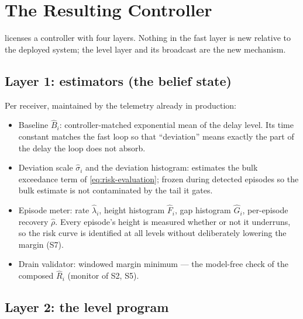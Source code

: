 \documentclass[11pt, a4paper]{article}
\theoremstyle{definition}
\theoremstyle{plain}
\theoremstyle{remark}
\begin{document}
\section{The Resulting Controller}\label{sec:controller}

 licenses a controller with four layers.  Nothing in
the fast layer is new relative to the deployed system; the level layer
and its broadcast are the new mechanism.

\subsection{Layer 1: estimators (the belief state)}
\label{sec:layer-estimators}

Per receiver, maintained by the telemetry already in production:
\begin{itemize}
  \item Baseline $\hat B_i$: controller-matched exponential mean of the
    delay level.  Its time constant matches the fast loop so that
    ``deviation'' means exactly the part of the delay the loop does not
    absorb.
  \item Deviation scale $\hat\sigma_i$ and the deviation histogram:
    estimates the bulk exceedance term of \cref{eq:risk-evaluation};
    frozen during detected episodes so the bulk estimate is not
    contaminated by the tail it gates.
  \item Episode meter: rate $\hat\lambda_i$, height histogram
    $\hat F_i$, gap histogram $\hat G_i$, per-episode recovery
    $\hat\rho$.  Every episode's height is measured whether or not it
    underruns, so the risk curve is identified at all levels without
    deliberately lowering the margin (S7).
  \item Drain validator: windowed margin minimum --- the model-free
    check of the composed $\hat R_i$ (monitor of S2, S5).
\end{itemize}

\subsection{Layer 2: the level program}\label{sec:layer-level}
\end{document}
